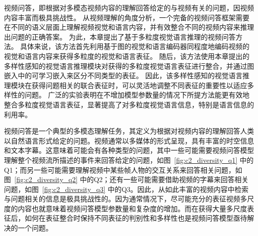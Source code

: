 

视频问答，即根据对多模态视频内容的理解回答给定的与视频有关的问题，因视频内容丰富而极具挑战性。
从视频理解的角度分析，一个完备的视频问答框架需要在不同的语义层面上理解视频视觉和语言内容，并有效整合不同的视频内容来推理出问题的正确答案。
为此，本章提出了基于多粒度视觉语言推理的视频问答方法。
具体来说，该方法首先利用基于图的视觉和语言编码器同程度地编码视频的视觉和语言内容来获得多粒度的视觉和语言表征。
随后，该方法使用本章提出的多样性感知的视觉语言推理模块对获得的多粒度视觉语言表征进行整合，并通过图嵌入中的可学习嵌入来区分不同类型的表征。
因此，该多样性感知的视觉语言推理模块在获得问题相关的联合表征时，可以灵活地调整不同表征的重要性以适应多样性的问题。
广泛的实验表明在不增加模型参数量的情况下所提方法能更有效地整合多粒度视觉语言表征，显著提高了对多粒度视觉语言信息，特别是语言信息的利用率。




视频问答是一个典型的多模态理解任务，其定义为根据对视频内容的理解回答人类以自然语言形式给定的问题。视频通常以多媒体的形式呈现，具有丰富的时空信息和文本字幕。这意味着可能会有各种类型的问题，其中一些可能需要视频问答模型理解整个视频流所描述的事件来回答给定的问题，如图~\ref{fig:c2_diversity_q1} 中的Q1；而另一些可能需要理解视频中某些帧人物的交互关系来回答相关问题，如图~\ref{fig:c2_diversity_q2} 中的Q2；还有一些可能需要借助视频的字幕来回答相关问题，如图~\ref{fig:c2_diversity_q3} 中的Q3。因此，从如此丰富的视频内容中检索与问题相关的信息是极具挑战性的。因为通常情况下，尽可能充分的表征视频多尺度的内容也就意味着视频问答模型参数量和复杂度的增加。而在获得大量多尺度表征后，如何在表征整合时保持不同表征的判别性和多样性也是视频问答模型亟待解决的一个问题。


